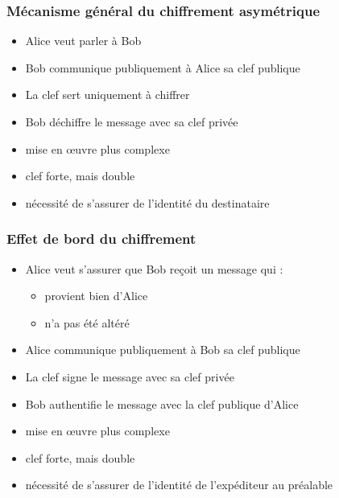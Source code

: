 \documentclass[french]{beamer}
\begin{document}
\begin{frame}
  \frametitle{Mécanisme général du chiffrement asymétrique}
  \begin{multicols}{2}
    \begin{block}{}
      \begin{itemize}
        \item Alice veut parler à Bob
        \item Bob communique publiquement à Alice sa clef publique
        \item La clef sert uniquement à chiffrer
        \item Bob déchiffre le message avec sa clef privée
      \end{itemize}
    \end{block}
    \begin{block}{}
      \begin{itemize}
        \item mise en œuvre plus complexe
        \item clef forte, mais double
        \item nécessité de s'assurer de l'identité du destinataire
      \end{itemize}
    \end{block}
  \end{multicols}
\end{frame}

\begin{frame}
  \frametitle{Effet de bord du chiffrement}
  \begin{multicols}{2}
    \begin{block}{}
      \begin{itemize}
        \item Alice veut s'assurer que Bob reçoit un message qui :
          \begin{itemize}
            \item provient bien d'Alice
            \item n'a pas été altéré
          \end{itemize}
        \item Alice communique publiquement à Bob sa clef publique
        \item La clef signe le message avec sa clef privée
        \item Bob authentifie le message avec la clef publique d'Alice
      \end{itemize}
    \end{block}
    \begin{block}{}
      \begin{itemize}
        \item mise en œuvre plus complexe
        \item clef forte, mais double
        \item nécessité de s'assurer de l'identité de l'expéditeur au
          préalable
      \end{itemize}
    \end{block}
  \end{multicols}
\end{frame}
\end{document}
